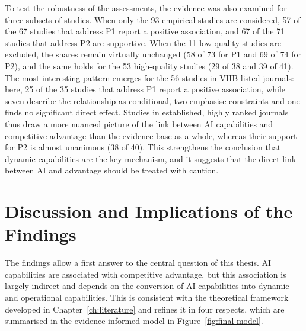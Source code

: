 To test the robustness of the assessments, the evidence was also examined for three subsets of studies. When only the 93 empirical studies are considered, 57 of the 67 studies that address P1 report a positive association, and 67 of the 71 studies that address P2 are supportive. When the 11 low-quality studies are excluded, the shares remain virtually unchanged (58 of 73 for P1 and 69 of 74 for P2), and the same holds for the 53 high-quality studies (29 of 38 and 39 of 41). The most interesting pattern emerges for the 56 studies in VHB-listed journals: here, 25 of the 35 studies that address P1 report a positive association, while seven describe the relationship as conditional, two emphasise constraints and one finds no significant direct effect. Studies in established, highly ranked journals thus draw a more nuanced picture of the link between AI capabilities and competitive advantage than the evidence base as a whole, whereas their support for P2 is almost unanimous (38 of 40). This strengthens the conclusion that dynamic capabilities are the key mechanism, and it suggests that the direct link between AI and advantage should be treated with caution.

\section{Discussion and Implications of the Findings}
\label{sec:discussion}

The findings allow a first answer to the central question of this thesis. AI capabilities are associated with competitive advantage, but this association is largely indirect and depends on the conversion of AI capabilities into dynamic and operational capabilities. This is consistent with the theoretical framework developed in Chapter~\ref{ch:literature} and refines it in four respects, which are summarised in the evidence-informed model in Figure~\ref{fig:final-model}.

